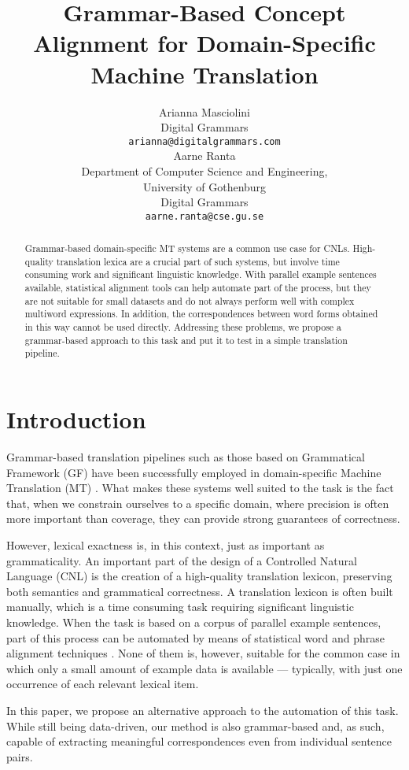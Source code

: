 \documentclass[11pt]{article}
\title{Grammar-Based Concept Alignment for Domain-Specific Machine Translation}
\author{Arianna Masciolini \\
  Digital Grammars \\
  \texttt{arianna@digitalgrammars.com} \\\And
  Aarne Ranta \\
  Department of Computer Science and Engineering, \\
  University of Gothenburg \\
  Digital Grammars \\
  \texttt{aarne.ranta@cse.gu.se} \\}
\begin{document}
\maketitle
\begin{abstract}
Grammar-based domain-specific MT systems are a common use case for CNLs.
High-quality translation lexica are a crucial part of such systems, but involve time consuming work and significant linguistic knowledge. 
With parallel example sentences available, statistical alignment tools
can help automate part of the process, but they are not suitable for
small datasets and do not always perform well with complex multiword expressions. 
In addition, the correspondences between word forms obtained in this way cannot be used directly.
Addressing these problems, we propose a grammar-based approach to this task and put it to test in a simple translation pipeline.
\end{abstract}

\section{Introduction}
Grammar-based translation pipelines such as those based on Grammatical Framework (GF) have been successfully employed in domain-specific Machine Translation (MT) \cite{ranta-etal-2020-abstract}.  
What makes these systems well suited to the task is the fact that, when we constrain ourselves to a specific domain, where precision is often more important than coverage, they can provide strong guarantees of correctness. 

However, lexical exactness is, in this context, just as important as grammaticality. 
An important part of the design of a Controlled Natural Language (CNL) is the creation of a high-quality translation lexicon, preserving both semantics and grammatical correctness.
A translation lexicon is often built manually, which is a time consuming task requiring significant linguistic knowledge. 
When the task is based on a corpus of parallel example sentences, part of this process can be automated by means of statistical word and phrase alignment techniques \cite{brown-etal-1993-mathematics, och-ney-2000-improved, dyer-etal-2013-simple}. 
None of them is, however, suitable for the common case in which only a small amount of example data is available --- typically, with just one occurrence of each relevant lexical item.

In this paper, we propose an alternative approach to the automation of this task. 
While still being data-driven, our method is also grammar-based and, as such, capable of extracting meaningful correspondences even from individual sentence pairs. 
\end{document}
